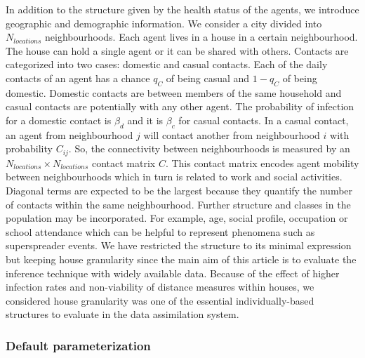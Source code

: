 \documentclass[11pt,a4paper]{article}
\begin{document}
In addition to the structure given by the health status of the agents, we introduce geographic and demographic information. We consider a city divided into $N_{locations}$ neighbourhoods. Each agent lives in a house in a certain neighbourhood. The house can hold a single agent or it can be shared with others. Contacts are categorized into two cases: domestic and casual contacts. Each of the daily contacts of an agent has a chance $q_C$ of being casual and $1-q_C$ of being domestic. Domestic contacts are between members of the same household and casual contacts are potentially with any other agent. The probability of infection for a domestic contact is $\beta_d$ and  it is $\beta_c$ for casual contacts. In a casual contact, an agent from neighbourhood $j$ will contact another from neighbourhood $i$ with probability $C_{ij}$. So, the connectivity between neighbourhoods is measured by an $N_{locations} \times N_{locations}$ contact matrix $C$. This contact matrix encodes agent mobility between neighbourhoods which in turn is related to work and social activities.  Diagonal terms are expected to be the largest because they quantify the number of contacts within the same neighbourhood. Further structure and classes in the population may be incorporated. For example, age, social profile, occupation or school attendance which can be helpful to represent phenomena such as superspreader events. We have restricted the structure to its minimal expression but keeping house granularity since the main aim of this article is to evaluate the inference technique with widely available data. Because of the effect of higher infection rates and non-viability of distance measures within houses, we considered house granularity was one of the essential individually-based structures to evaluate in the data assimilation system.

\subsubsection{Default parameterization}
\end{document}
